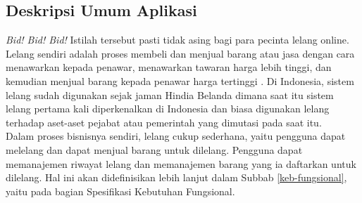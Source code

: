 \subsection{Deskripsi Umum Aplikasi}
	\label{deskripsi-umum-app}

	\textit{Bid! Bid! Bid!} Istilah tersebut pasti tidak asing bagi para pecinta lelang online. Lelang sendiri adalah proses membeli dan menjual barang atau jasa dengan cara menawarkan kepada penawar, menawarkan tawaran harga lebih tinggi, dan kemudian menjual barang kepada penawar harga tertinggi \cite{wikipedia_lelang_2017}.  Di Indonesia, sistem lelang sudah digunakan sejak jaman Hindia Belanda dimana saat itu sistem lelang pertama kali diperkenalkan di Indonesia dan biasa digunakan lelang terhadap aset-aset pejabat atau pemerintah yang dimutasi pada saat itu. \\	 	
	\indent Dalam proses bisnisnya sendiri, lelang cukup sederhana, yaitu pengguna dapat melelang dan dapat menjual barang untuk dilelang. Pengguna dapat memanajemen riwayat lelang dan memanajemen barang yang ia daftarkan untuk dilelang. Hal ini akan didefinisikan lebih lanjut dalam Subbab \ref{keb-fungsional}, yaitu pada bagian Spesifikasi Kebutuhan Fungsional.
